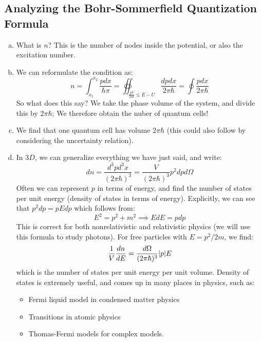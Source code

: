 \subsection{Analyzing the Bohr-Sommerfield Quantization Formula}
\begin{enumerate}[(a)]
    \item What is $n$? This is the number of nodes inside the potential, or also the excitation number.
    \item We can reformulate the condition as:
    \begin{equation}
        n = \int_{x_1}^{x_2}\frac{pdx}{\hbar \pi} = \oiint_{\frac{P^2}{2m} \leq E - U} \frac{dpdx}{2\pi\hbar} = \oint \frac{pdx}{2\pi\hbar}
    \end{equation}
    So what does this say? We take the phase volume of the system, and divide this by $2\pi\hbar$; We therefore obtain the nuber of quantum cells! 
    \item We find that one quantum cell has volume $2\pi\hbar$ (this could also follow by considering the uncertainty relation).
    \item In $3D$, we can generalize everything we have just said, and write:
    \begin{equation}
        dn = \frac{d^3pd^3x}{(2\pi\hbar)^3} = \frac{V}{(2\pi\hbar)^3}p^2dpd\Omega
    \end{equation}
    Often we can represent $p$ in terms of energy, and find the number of states per unit energy (density of states in terms of energy). Explicitly, we can see that $p^2 dp = pEdp$ which follows from:
    \begin{equation}
        E^2 = p^2  +m^2 \implies EdE = pdp
    \end{equation}
    This is correct for both nonrelativistic and relativistic physics (we will use this formula to study photons). For free particles with $E = p^2/2m$, we find:
    \begin{equation}
        \frac{1}{V}\frac{dn}{dE} = \frac{d\Omega}{(2\pi\hbar)^3}\lvert p \rvert E
    \end{equation}
    which is the number of states per unit energy per unit volume. Density of states is extremely useful, and comes up in many places in physics, such as:
    \begin{itemize}
        \item Fermi liquid model in condensed matter physics
        \item Transitions in atomic physics
        \item Thomas-Fermi models for complex models.
    \end{itemize}
\end{enumerate}

